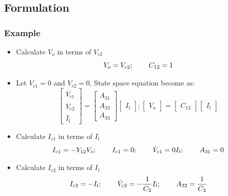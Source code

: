 \documentclass{beamer}
\begin{document}
\subsection*{Formulation}

\begin{frame}
\frametitle{Example}
\begin{small}
\begin{itemize}
\item Calculate $V_{o}$ in terms of $V_{c2}$\\
\begin{equation}
V_o=V_{c2}; \hspace{0.3in} C_{12}=1
\end{equation}
\item{Let $V_{c1}=0$ and $V_{c2}=0$, State space equation become as:} \\

\[ \left[ \begin{array}{cc}
\dot{V_{c1}} \\
\dot{V_{c2}} \\
\dot{I_l}
\end{array} \right]
=
\left[ \begin{array}{ccc}
A_{31} \\
A_{32} \\
A_{33} 
\end{array} \right]
%
\left[ \begin{array}{c}
{I_l}
\end{array} \right];
\left[ \begin{array}{c}
{V_{o}}
\end{array} \right]
=
\left[ \begin{array}{c}
{C_{13}}
\end{array} \right]
\left[ \begin{array}{c}
{I_l}
\end{array} \right]
\]

\item Calculate $I_{c1}$ in terms of $I_l$\\
\begin{equation}
I_{c1}=-Y_{12}V_{o}; \hspace{.3in}I_{c1}=0;\hspace{.3in} \dot{V}_{c1}=0I_l;\hspace{.3in} A_{31}=0
\end{equation}

\item Calculate $I_{c2}$ in terms of $I_l$\\
\begin{equation}
I_{c2}=-I_l;\hspace{.3in} \dot{V}_{c2}=-\frac{1}{C_2}I_{l};\hspace{.3in} A_{32}=\frac{1}{C_2}
\end{equation}

\end{itemize}
\end{small}
\end{frame}
\end{document}
